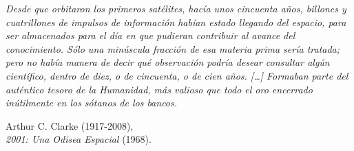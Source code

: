 	\cleardoublepage

	\vspace{5cm}
	\begin{adjustwidth}{0.075\textwidth}{0.075\textwidth}
	
		\emph{Desde que orbitaron los primeros satélites, hacía unos
        cincuenta años, billones y cuatrillones de impulsos de
        información habían estado llegando del espacio, para ser
        almacenados para el día en que pudieran contribuir al avance
        del conocimiento. Sólo una minúscula fracción de esa materia
        prima sería tratada; pero no había manera de decir qué
        observación podría desear consultar algún científico, dentro de
        diez, o de cincuenta, o de cien años. […] Formaban parte del
        auténtico tesoro de la Humanidad, más valioso que todo el oro
        encerrado inútilmente en los sótanos de los bancos.}
		
		\vspace{1.5\baselineskip} %
	
		\begin{flushright}
			Arthur C. Clarke (1917-2008),\\ 
			\emph{2001: Una Odisea Espacial} (1968).
		\end{flushright}
	\end{adjustwidth}

	\cleardoublepage


	\pagestyle{headings}
	\tableofcontents* %

	\cleardoublepage

	\listoffigures

	\cleardoublepage

	\listoftables

	\cleardoublepage

	\lstlistoflistings
	
	\cleardoublepage